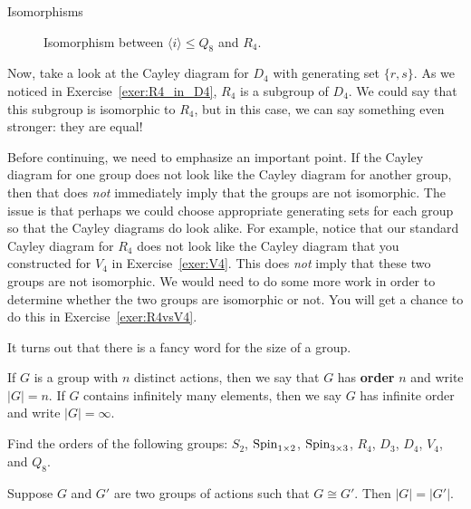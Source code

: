 \begin{section}{Isomorphisms}
\begin{figure}[!ht]
\caption{Isomorphism between $\langle i\rangle\leq Q_8$ and $R_4$.}\label{fig:isoR4}
\end{figure}

Now, take a look at the Cayley diagram for $D_4$ with generating set $\{r,s\}$.  As we noticed in Exercise~\ref{exer:R4_in_D4}, $R_4$ is a subgroup of $D_4$.  We could say that this subgroup is isomorphic to $R_4$, but in this case, we can say something even stronger: they are equal!

Before continuing, we need to emphasize an important point.  If the Cayley diagram for one group does not look like the Cayley diagram for another group, then that does \emph{not} immediately imply that the groups are not isomorphic.  The issue is that perhaps we could choose appropriate generating sets for each group so that the Cayley diagrams do look alike.  For example, notice that our standard Cayley diagram for $R_4$ does not look like the Cayley diagram that you constructed for $V_4$ in Exercise~\ref{exer:V4}.  This does \emph{not} imply that these two groups are not isomorphic.  We would need to do some more work in order to determine whether the two groups are isomorphic or not.  You will get a chance to do this in Exercise~\ref{exer:R4vsV4}.

It turns out that there is a fancy word for the size of a group.

\begin{definition}
If $G$ is a group with $n$ distinct actions, then we say that $G$ has \textbf{order} $n$ and write $|G|=n$.  If $G$ contains infinitely many elements, then we say $G$ has infinite order and write $|G|=\infty$.
\end{definition}

\begin{exercise}
Find the orders of the following groups: $S_2$, $\operatorname{Spin}_{1\times 2}$, $\operatorname{Spin}_{3\times 3}$, $R_4$, $D_3$, $D_4$, $V_4$, and $Q_8$.
\end{exercise}

\begin{theorem}\label{thm:iso_same_order}
Suppose $G$ and $G'$ are two groups of actions such that $G\cong G'$.  Then $|G|=|G'|$.
\end{theorem}


\end{section}
